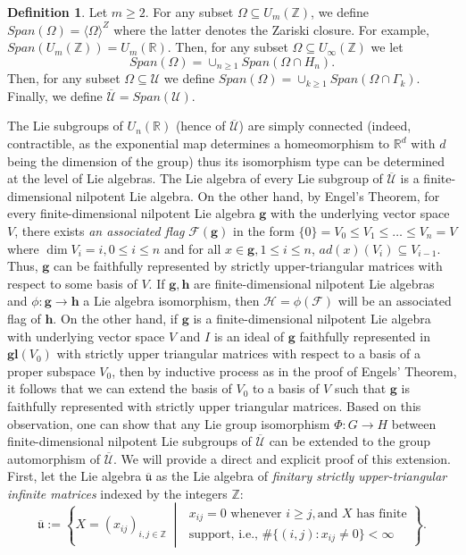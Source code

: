 \documentclass[12pt]{amsart}
\theoremstyle{definition}
\newtheorem{defn}[thm]{Definition}
\newcommand{\blackboard}[1]{\ensuremath{\mathbb{#1}}}
\newcommand{\R}{\blackboard{R}}
\begin{document}
  
    
    \begin{defn} Let $m\geq 2$. For any subset $\Omega \subseteq U_{m}(\mathbb{Z})$, we define $Span(\Omega ) = \langle \Omega \rangle ^{Z}$ where the latter denotes the Zariski closure. For example, $Span ( U_{m}(\mathbb{Z})) =  U_{m}(\mathbb{R})$. Then, for any subset $\Omega \subseteq U_{\infty }(\mathbb{Z})$ we let $$Span(\Omega ) = \displaystyle \mathop{\cup }_{n\geq 1}Span(\Omega \cap H_n).$$ Then, for any subset $\Omega \subseteq \mathcal{U}$ we define $Span(\Omega ) = \displaystyle \mathop{\cup }_{k\geq 1}Span(\Omega \cap \Gamma _k).$ Finally, we define $\overline {\mathcal{U}} = Span (\mathcal{U})$. 
\end{defn}
    
    \medskip

 The Lie subgroups of $U_n(\mathbb{R})$ (hence of $\overline{\mathcal{U}}$) are simply connected (indeed, contractible, as the exponential map determines a homeomorphism to $\R^d$ with $d$ being the dimension of the group) thus its isomorphism type can be determined at the level of Lie algebras. The Lie algebra of every Lie subgroup of $\overline{\mathcal{U}}$ is a finite-dimensional nilpotent Lie algebra. On the other hand, by Engel's Theorem, for every finite-dimensional nilpotent Lie algebra $\mathbf{g}$ with the underlying vector space $V$, there exists {\em an associated flag} $\mathcal{F}(\mathbf{g})$ in the form $\{0\} = V_0\leq V_1\leq \dots \leq V_n = V$ where $\dim V_i = i, 0\leq i\leq n$ and for all $x\in \mathbf{g}, 1\leq i \leq n$, $ad(x)(V_i)\subseteq V_{i-1}$. Thus, $\mathbf{g}$ can be faithfully represented by strictly upper-triangular matrices with respect to some basis of $V$. If $\mathbf{g}, \mathbf{h}$ are finite-dimensional nilpotent Lie algebras and $\phi :\mathbf{g}\to \mathbf{h}$ a Lie algebra isomorphism, then $\mathcal{H} = \phi (\mathcal{F})$ will be an associated flag of $\mathbf{h}$. On the other hand, if $\mathbf{g}$ is a finite-dimensional nilpotent Lie algebra with underlying vector space $V$ and $I$ is an ideal of $\mathbf{g}$ faithfully represented in $\mathbf{gl}(V_0)$ with strictly upper triangular matrices with respect to a basis of a proper subspace $V_0$,  then by inductive process as in the proof of Engels' Theorem, it follows that we can extend the basis of $V_0$ to a basis of $V$ such that $\mathbf{g}$ is faithfully represented with strictly upper triangular matrices. Based on this observation, one can show that any Lie group isomorphism $\Phi :G\to H$ between finite-dimensional nilpotent Lie subgroups of $\overline{\mathcal{U}}$ can be extended to the group automorphism of $\overline{\mathcal{U}}$. We will provide a direct and explicit proof of this extension. First, let the Lie algebra \( \overline{\mathfrak{u}} \) as the Lie algebra of \emph{finitary strictly upper-triangular infinite matrices} indexed by the integers \( \mathbb{Z} \):
\[
\overline{\mathfrak{u}} := \left\{ X = (x_{ij})_{i,j \in \mathbb{Z}} \; \middle| \;
\begin{array}{l}
x_{ij} = 0 \text{ whenever } i \ge j, \text{and } X \text{ has finite} \\
\text{support, i.e., } \# \{ (i,j) : x_{ij} \neq 0 \} < \infty
\end{array}
\right\}.
\]
\end{document}
